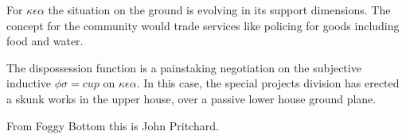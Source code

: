 

For $\kappa\epsilon\alpha$ the situation on the ground is evolving in
its support dimensions.  The concept for the community would trade
services like policing for goods including food and water.  

The dispossession function is a painstaking negotiation on the
subjective inductive $\phi\sigma = cup$ on $\kappa\epsilon\alpha$.  In
this case, the special projects division has erected a skunk works in
the upper house, over a passive lower house ground plane.  

From Foggy Bottom this is John Pritchard.

\bye
